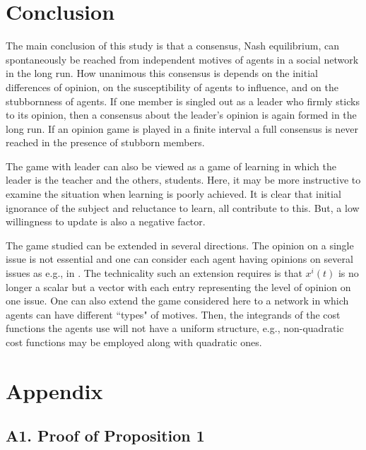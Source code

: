 \documentclass[10pt, conference, compsocconf]{IEEEtran}
\begin{document}
\section{Conclusion}

The main conclusion of this study is that a consensus, Nash equilibrium, can spontaneously be reached from independent motives of agents in a social network in the long run. How unanimous this consensus is depends on the initial differences of opinion, on the susceptibility of agents to influence, and on the stubbornness of agents. If one member is singled out as a leader who firmly sticks to its opinion, then a consensus about the leader's opinion is again formed in the long run. If an opinion game is played in a finite interval a full consensus is never reached in the presence of stubborn members.

The game with leader can also be viewed as a game of learning in which the leader is the teacher and the others, students. Here, it may be more instructive to examine the situation when learning is poorly achieved.  It is clear that initial ignorance of the subject and reluctance to learn, all contribute to this. But, a low willingness to update is also a negative factor.

The game studied can be extended in several directions. The opinion on a single issue is not essential and one can consider each agent having opinions on several issues as e.g., in \cite{krause}. The technicality such an extension requires is that $x^i(t)$ is no longer a scalar but a vector with each entry representing the level of opinion on one issue. One can also extend the game considered here to a network in which agents can have different ``types" of motives. Then, the integrands of the cost functions the agents use will not have a uniform structure, e.g., non-quadratic cost functions may be employed along with quadratic ones.



\section*{Appendix}

\subsection*{A1. Proof of Proposition 1}
\end{document}
